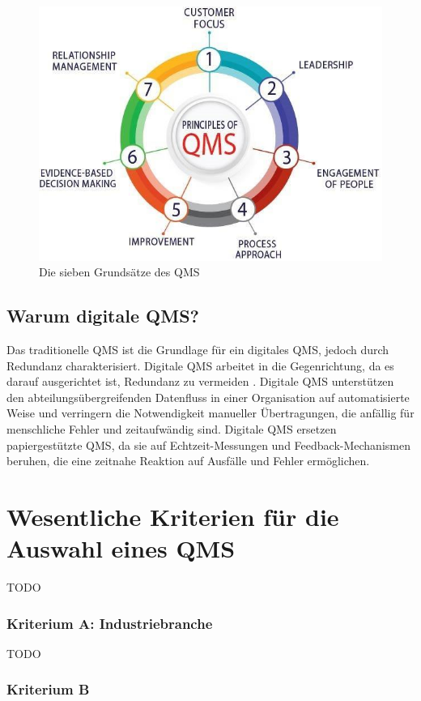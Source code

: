 \documentclass[11pt]{scrartcl}       %
\begin{document}
\begin{figure}[!htb]
	\centering
	\includegraphics[width=.5\textwidth]{img/qms_iso9001.jpg}
	\caption{Die sieben Grundsätze des QMS}
\label{fig:qms_principles}
\end{figure}




\subsection{Warum digitale QMS?}
Das traditionelle QMS ist die Grundlage für ein digitales QMS, jedoch durch Redundanz charakterisiert. Digitale QMS arbeitet in die Gegenrichtung, da es darauf ausgerichtet ist, Redundanz zu vermeiden \cite{ibrahim2019digital}. Digitale QMS unterstützen den abteilungsübergreifenden Datenfluss in einer Organisation auf automatisierte Weise und verringern die Notwendigkeit manueller Übertragungen, die anfällig für menschliche Fehler und zeitaufwändig sind. Digitale QMS ersetzen papiergestützte QMS, da sie auf Echtzeit-Messungen und Feedback-Mechanismen beruhen, die eine zeitnahe Reaktion auf Ausfälle und Fehler ermöglichen. \cite{yeung2003empirical}


\section{Wesentliche Kriterien für die Auswahl eines QMS}

TODO

\subsubsection{Kriterium A: Industriebranche}

TODO



\subsubsection{Kriterium B}
\end{document}
